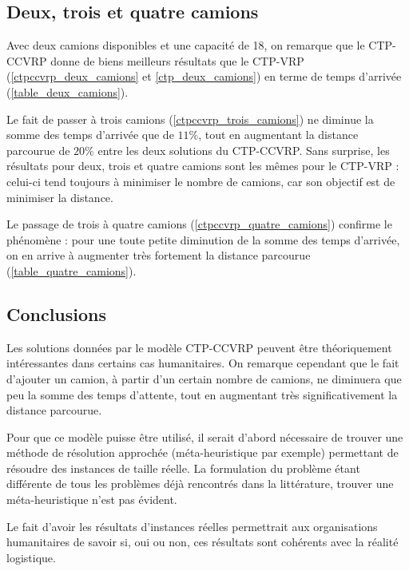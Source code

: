 \documentclass[5p,authoryear]{elsarticle}
\begin{document}
\subsection{Deux, trois et quatre camions}
Avec deux camions disponibles et une capacité de 18, on remarque que le CTP-CCVRP donne de biens meilleurs résultats que le CTP-VRP (\cref{ctpccvrp_deux_camions} et \cref{ctp_deux_camions}) en terme de temps d'arrivée (\cref{table_deux_camions}).

Le fait de passer à trois camions (\cref{ctpccvrp_trois_camions}) ne diminue la somme des temps d'arrivée que de $11\%$, tout en augmentant la distance parcourue de $20\%$ entre les deux solutions du CTP-CCVRP. Sans surprise, les résultats pour deux, trois et quatre camions sont les mêmes pour le CTP-VRP : celui-ci tend toujours à minimiser le nombre de camions, car son objectif est de minimiser la distance. 

Le passage de trois à quatre camions (\cref{ctpccvrp_quatre_camions}) confirme le phénomène : pour une toute petite diminution de la somme des temps d'arrivée, on en arrive à augmenter très fortement la distance parcourue (\cref{table_quatre_camions}).

\subsection{Conclusions}

Les solutions données par le modèle CTP-CCVRP peuvent être théoriquement intéressantes dans certains cas humanitaires. On remarque cependant que le fait d'ajouter un camion, à partir d'un certain nombre de camions, ne diminuera que peu la somme des temps d'attente, tout en augmentant très significativement la distance parcourue.

Pour que ce modèle puisse être utilisé, il serait d'abord nécessaire de trouver une méthode de résolution approchée (méta-heuristique par exemple) permettant de résoudre des instances de taille réelle. La formulation du problème étant différente de tous les problèmes déjà rencontrés dans la littérature, trouver une méta-heuristique n'est pas évident.

Le fait d'avoir les résultats d'instances réelles permettrait aux organisations humanitaires de savoir si, oui ou non, ces résultats sont cohérents avec la réalité logistique.
\end{document}
